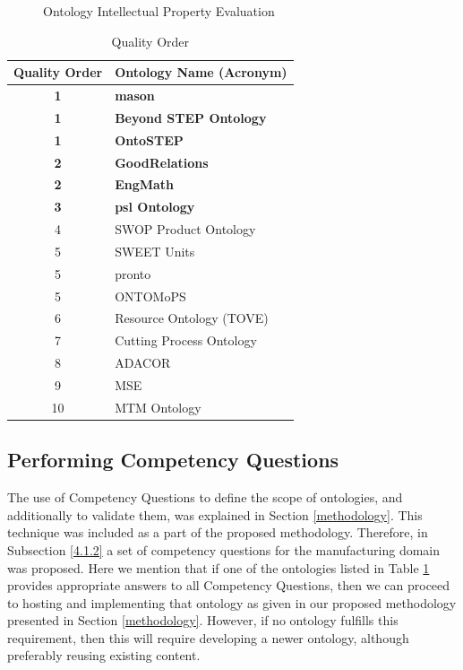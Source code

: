 \begin{figure}
\begin{minipage}{.5\textwidth}
		\caption{Ontology Intellectual Property Evaluation}
		\label{figure4-4}
	\end{minipage}%
\end{figure}







\begin{table}[tp]%
	
	\caption{Quality Order}
	\label{table4.2}\centering %
	\begin{tabular}{cl}
		\toprule %
		Quality Order &	Ontology Name (Acronym) \\\toprule
		
		\textbf{1}&	\textbf{\gls{mason}} \\\toprule
		\textbf{1}&	\textbf{Beyond STEP Ontology}\\\toprule
		\textbf{1}&	\textbf{OntoSTEP}\\\toprule
		\textbf{2}&	\textbf{GoodRelations}\\\toprule
		\textbf{2}&	\textbf{EngMath}\\\toprule
		\textbf{3}&	\textbf{\gls{psl} Ontology}\\\toprule
		4&	SWOP Product Ontology \\\toprule
		5&	SWEET Units\\\toprule
		5&	\gls{pronto}\\\toprule
		5&	ONTOMoPS\\\toprule
		6&	Resource Ontology (TOVE)\\\toprule
		7&	Cutting Process Ontology\\\toprule
		8&	ADACOR\\\toprule
		9&	MSE\\\toprule
		10&	MTM Ontology\\\toprule
		
		
		
		
	\end{tabular}
	
	
\end{table}



\subsection{Performing Competency Questions}\label{subsection4.2.3}

The use of Competency Questions to define the scope of ontologies, and additionally to validate them, was explained in Section \ref{methodology}. This technique was included as a part of the proposed methodology.   Therefore, in Subsection \ref{4.1.2} a set of competency questions for the manufacturing domain was proposed. Here we mention that if one of the ontologies listed in  Table \ref{table4.2} provides appropriate answers to all Competency Questions, then we can proceed to hosting and implementing that ontology as given in our proposed methodology presented in Section \ref{methodology}. However, if no ontology fulfills this requirement, then this will require developing a newer ontology, although preferably reusing existing content.  

